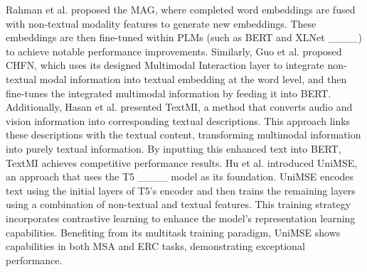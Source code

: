 	Rahman et al.  proposed the MAG, where completed word embeddings are fused with non-textual modality features to generate new embeddings. These embeddings are then fine-tuned within PLMs (such as BERT and XLNet ____) to achieve notable performance improvements.
	Similarly, Guo et al.  proposed CHFN, which uses its designed Multimodal Interaction layer to integrate non-textual modal information into textual embedding at the word level, and then fine-tunes the integrated multimodal information by feeding it into BERT.  
	Additionally, Hasan et al.  presented TextMI, a method that converts audio and vision information into corresponding textual descriptions. This approach links these descriptions with the textual content, transforming multimodal information into purely textual information. By inputting this enhanced text into BERT, TextMI achieves competitive performance results.
	Hu et al.  introduced UniMSE, an approach that uses the T5 ____ model as its foundation. UniMSE encodes text using the initial layers of T5's encoder and then trains the remaining layers using a combination of non-textual and textual features. This training strategy incorporates contrastive learning to enhance the model's representation learning capabilities. Benefiting from its multitask training paradigm, UniMSE shows capabilities in both MSA and ERC tasks, demonstrating exceptional performance.

